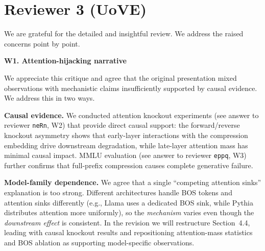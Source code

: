 \section{Reviewer 3 (UoVE)}

We are grateful for the detailed and insightful review. We address the raised concerns point by point.


\textbf{W1. Attention-hijacking narrative}


We appreciate this critique and agree that the original presentation mixed observations
with mechanistic claims insufficiently supported by causal evidence. We address this
in two ways.

\textbf{Causal evidence.} We conducted attention knockout experiments
(see answer to reviewer \texttt{neRn}, W2) that provide direct causal support:
the forward/reverse knockout asymmetry shows that early-layer interactions with the
compression embedding drive downstream degradation, while late-layer attention mass
has minimal causal impact. MMLU evaluation (see answer to reviewer \texttt{eppq}, W3)
further confirms that full-prefix compression causes complete generative failure.

\textbf{Model-family dependence.} We agree that a single ``competing attention sinks''
explanation is too strong. Different architectures handle BOS tokens and attention
sinks differently (e.g., Llama uses a dedicated BOS sink, while Pythia distributes
attention more uniformly), so the \emph{mechanism} varies even though the
\emph{downstream effect} is consistent. In the revision we will restructure
Section~4.4, leading with causal knockout results and repositioning attention-mass
statistics and BOS ablation as supporting model-specific observations.

